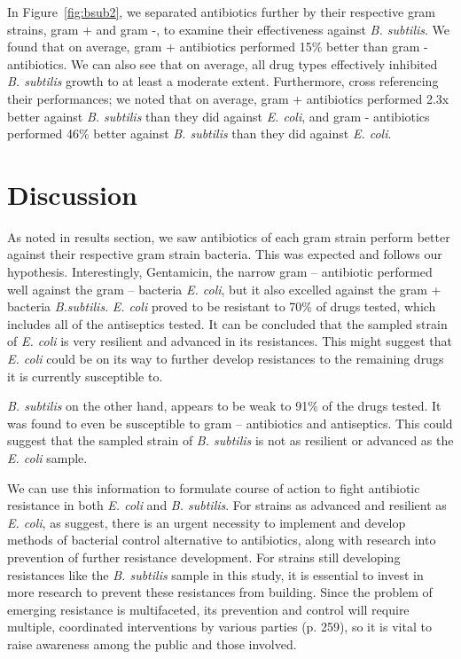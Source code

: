 \documentclass[11pt, twocolumn]{article}
\begin{document}
In Figure~\ref{fig:bsub2}, we separated antibiotics further by their respective gram strains, gram + and gram -, to examine their effectiveness against \textit{B. subtilis}. We found that on average, gram + antibiotics performed 15\% better than gram - antibiotics. We can also see that on average, all drug types effectively inhibited \textit{B. subtilis} growth to at least a moderate extent. Furthermore, cross referencing their performances; we noted that on average, gram + antibiotics performed 2.3x better against \textit{B. subtilis} than they did against \textit{E. coli}, and gram - antibiotics performed 46\% better against \textit{B. subtilis} than they did against \textit{E. coli}.


\section{Discussion}

As noted in results section, we saw antibiotics of each gram strain perform better against their respective gram strain bacteria. This was expected and follows our hypothesis. Interestingly, Gentamicin, the narrow gram – antibiotic performed well against the gram – bacteria \textit{E. coli}, but it also excelled against the gram + bacteria \textit{B.subtilis}. \textit{E. coli}  proved to be resistant to 70\% of drugs tested, which includes all of the antiseptics tested. It can be concluded that the sampled strain of \textit{E. coli} is very resilient and advanced in its resistances. This might suggest that \textit{E. coli} could be on its way to further develop resistances to the remaining drugs it is currently susceptible to. 

\textit{B. subtilis} on the other hand, appears to be weak to 91\% of the drugs tested. It was found to even be susceptible to gram – antibiotics and antiseptics. This could suggest that the sampled strain of \textit{B. subtilis} is not as resilient or advanced as the \textit{E. coli} sample.
  
We can use this information to formulate course of action to fight antibiotic resistance in both \textit{E. coli} and \textit{B. subtilis}. For strains as advanced and resilient as \textit{E. coli}, as \citet{Urban-Chmiel_2022} suggest, there is an urgent necessity to implement and develop methods of bacterial control alternative to antibiotics, along with research into prevention of further resistance development. For strains still developing resistances like the \textit{B. subtilis} sample in this study, it is essential to invest in more research to prevent these resistances from building.  Since the problem of emerging resistance is multifaceted, its prevention and control will require multiple, coordinated interventions by various parties \citep{Akova_2016} (p. 259), so it is vital to raise awareness among the public and those involved.  
\end{document}
